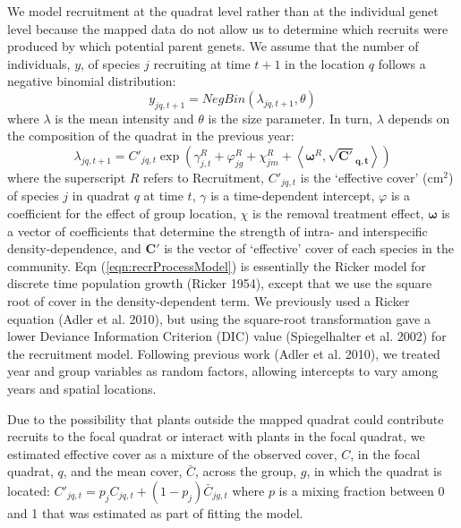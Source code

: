 \documentclass[11pt]{article}
\begin{document}
\begin{doublespacing}
We model recruitment at the quadrat level rather than at the individual genet level because the mapped data do not allow us to determine which recruits were produced by which potential parent genets. We assume that the number of individuals, $y$, of species $j$ recruiting at time $t+1$ in the location $q$ follows a negative binomial distribution:
\begin{equation}
y_{jq,t+1}= NegBin(\lambda_{jq,t+1},\theta) 	   
\label{eqn:recrDataModel}
\end{equation}
where $\lambda$ is the mean intensity and $\theta$ is the size parameter. In turn, $\lambda$ depends on the composition of the quadrat in the previous year:
\begin{equation}
\lambda_{jq,t+1} = C'_{jq,t} \exp{ \left(\gamma_{j,t}^R +  \varphi_{jg}^R + \chi_{jm}^R + 
\left \langle \boldsymbol{\omega}^R , \boldsymbol{\sqrt{C'}_{q,t}} \right \rangle \right) }
\label{eqn:recrProcessModel}
\end{equation}
where the superscript $R$ refers to Recruitment, $C'_{jq,t}$ is the `effective cover' (cm$^2$) of species $j$ in quadrat $q$ at time $t$, $\gamma$ is a time-dependent intercept, $\varphi$ is a coefficient for the effect of group location,
$\chi$ is the removal treatment effect, $\boldsymbol{\omega}$ is a vector of coefficients that determine the strength of intra- and interspecific density-dependence, and $\boldsymbol{C'}$ is the vector of ‘effective’ cover of each species in the community. Eqn (\ref{eqn:recrProcessModel}) is essentially the Ricker model for discrete time population growth (Ricker 1954), except that we use the square root of cover in the density-dependent term. We previously used a Ricker equation (Adler et al. 2010), but using the square-root transformation gave a lower Deviance Information Criterion (DIC) value (Spiegelhalter et al. 2002) for the recruitment model. Following previous work (Adler et al. 2010), we treated year and group variables as random factors, allowing intercepts to vary among years and spatial locations. 

Due to the possibility that plants outside the mapped quadrat could contribute recruits to the focal quadrat or interact with plants in the focal quadrat, we estimated effective cover as a mixture of the observed cover, $C$, in the focal quadrat, $q$, and the mean cover, $\bar{C}$, across the group, $g$, in which the quadrat is located:
$C'_{jq,t}=p_j C_{jq,t}+(1-p_j) \bar{C}_{jg,t}$								
where $p$ is a mixing fraction between 0 and 1 that was estimated as part of fitting the model.


\end{doublespacing}
\end{document}
